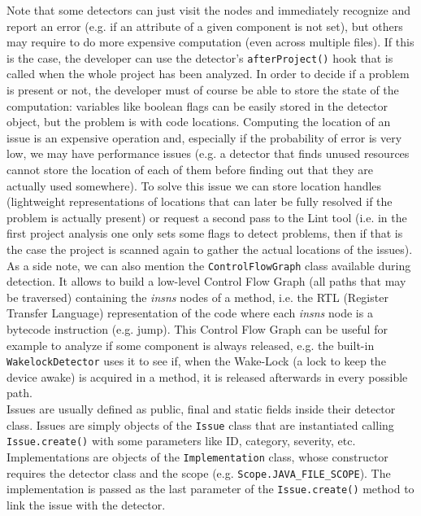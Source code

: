 \documentclass[11pt,a4paper,notitlepage]{article}
\begin{document}
Note that some detectors can just visit the nodes and immediately recognize and report an error (e.g. if an attribute of a given component is not set), but others may require to do more expensive computation (even across multiple files). If this is the case, the developer can use the detector's \texttt{afterProject()} hook that is called when the whole project has been analyzed. In order to decide if a problem is present or not, the developer must of course be able to store the state of the computation: variables like boolean flags can be easily stored in the detector object, but the problem is with code locations. Computing the location of an issue is an expensive operation and, especially if the probability of error is very low, we may have performance issues (e.g. a detector that finds unused resources cannot store the location of each of them before finding out that they are actually used somewhere). To solve this issue we can store location handles (lightweight representations of locations that can later be fully resolved if the problem is actually present) or request a second pass to the Lint tool (i.e. in the first project analysis one only sets some flags to detect problems, then if that is the case the project is scanned again to gather the actual locations of the issues).\medskip \\
As a side note, we can also mention the \texttt{ControlFlowGraph} class available during detection. It allows to build a low-level Control Flow Graph (all paths that may be traversed) containing the \textit{insns} nodes of a method, i.e. the RTL (Register Transfer Language) representation of the code where each \textit{insns} node is a bytecode instruction (e.g. jump). This Control Flow Graph can be useful for example to analyze if some component is always released, e.g. the built-in \texttt{WakelockDetector} uses it to see if, when the Wake-Lock (a lock to keep the device awake) is acquired in a method, it is released afterwards in every possible path.\bigskip \\
Issues are usually defined as public, final and static fields inside their detector class. Issues are simply objects of the \texttt{Issue} class that are instantiated calling \texttt{Issue.create()} with some parameters like ID, category, severity, etc.\bigskip \\
Implementations are objects of the \texttt{Implementation} class, whose constructor requires the detector class and the scope (e.g. \texttt{Scope.JAVA\_FILE\_SCOPE}). The implementation is passed as the last parameter of the \texttt{Issue.create()} method to link the issue with the detector.\bigskip \\
\end{document}
